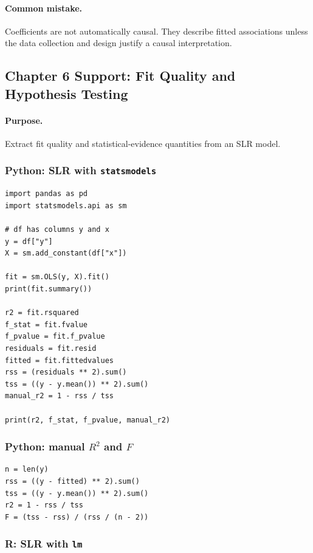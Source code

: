 \paragraph{Common mistake.} Coefficients are not automatically causal.  They describe fitted associations unless the data collection and design justify a causal interpretation.

\subsection{Chapter 6 Support: Fit Quality and Hypothesis Testing}
\label{app:ch06-software-cookbook-fit-quality-and-hypothesis-testing}

\paragraph{Purpose.} Extract fit quality and statistical-evidence quantities from an SLR model.

\subsubsection*{Python: SLR with \texttt{statsmodels}}

\begin{verbatim}
import pandas as pd
import statsmodels.api as sm

# df has columns y and x
y = df["y"]
X = sm.add_constant(df["x"])

fit = sm.OLS(y, X).fit()
print(fit.summary())

r2 = fit.rsquared
f_stat = fit.fvalue
f_pvalue = fit.f_pvalue
residuals = fit.resid
fitted = fit.fittedvalues
rss = (residuals ** 2).sum()
tss = ((y - y.mean()) ** 2).sum()
manual_r2 = 1 - rss / tss

print(r2, f_stat, f_pvalue, manual_r2)
\end{verbatim}

\subsubsection*{Python: manual \(R^2\) and \(F\)}

\begin{verbatim}
n = len(y)
rss = ((y - fitted) ** 2).sum()
tss = ((y - y.mean()) ** 2).sum()
r2 = 1 - rss / tss
F = (tss - rss) / (rss / (n - 2))
\end{verbatim}

\subsubsection*{R: SLR with \texttt{lm}}

